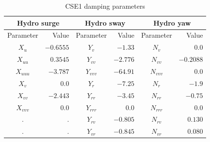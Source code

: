 \begin{table}[h!]
	\begin{centering}
		\begin{tabular}{crcrcr}
			\multicolumn{2}{c}{Hydro surge} & \multicolumn{2}{c}{Hydro sway} & \multicolumn{2}{c}{Hydro yaw}\tabularnewline
			\midrule 
			{Parameter}  & {Value}  & {Parameter}  & {Value}  & {Parameter}  & {Value} \tabularnewline
			\midrule 
			$X_{u}$  & $-0.6555$  & $Y_{v}$  & $-1.33$  & $N_{v}$  & $0.0$ \tabularnewline
			$X_{uu}$  & $0.3545$  & $Y_{vv}$  & $-2.776$  & $N_{vv}$  & $-0.2088$ \tabularnewline
			$X_{uuu}$  & $-3.787$  & $Y_{vvv}$  & $-64.91$  & $N_{vvv}$  & $0.0$ \tabularnewline
			$X_{v}$  & $0.0$  & $Y_{r}$  & $-7.25$  & $N_{r}$  & $-1.9$ \tabularnewline
			$X_{vv}$  & $-2.443$  & $Y_{rr}$  & $-3.45$  & $N_{rr}$  & $-0.75$ \tabularnewline
			$X_{vvv}$  & $0.0$  & $Y_{rrr}$  & $0.0$  & $N_{rrr}$  & $0.0$ \tabularnewline
			$.$  & $.$  & $Y_{rv}$  & $-0.805$  & $N_{rv}$  & $0.130$ \tabularnewline
			$.$  & $.$  & $Y_{vr}$  & $-0.845$  & $N_{vr}$  & $0.080$ \tabularnewline
			\bottomrule
		\end{tabular}
		\par\end{centering}
	\caption{CSE1 damping parameters}
	\label{tab: CSE1 damping parameters 2}
\end{table}